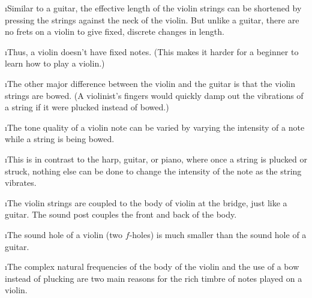 \i Similar to a guitar, the effective length of 
the violin strings can be shortened by pressing the 
strings against the neck of the violin.
But unlike a guitar, there are no frets on a violin 
to give fixed, discrete changes in length.

\i Thus, a violin doesn't have fixed notes.
(This makes it harder for a beginner to learn
how to play a violin.)

\i The other major difference between the violin and 
the guitar is that the violin strings are bowed.
(A violinist's fingers would quickly damp 
out the vibrations of a string if it were plucked 
instead of bowed.)

\i The tone quality of a violin note can be varied by 
varying the intensity of a note while a string is being bowed.
 
\i This is in contrast to the  harp, guitar, or piano, 
where once a string is plucked or struck, nothing else can be
done to change the intensity of the note as the string vibrates.

\i The violin strings are coupled
to the body of violin at the bridge, just like a guitar.
The sound post couples the front and back of the body.

\i The sound hole of a violin (two $f$-holes)
is much smaller than the sound hole of a guitar.

\i The complex natural frequencies of the body of the 
violin and the use of a bow instead of plucking are 
two main reasons for the rich timbre of notes played on
a violin.

\ei
